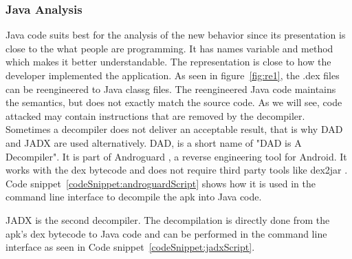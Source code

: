 \subsubsection{Java Analysis} \label{subsection:forensics-tools-java}
Java code suits best for the analysis of the new behavior since its presentation is close to the what people are programming.
It has names variable and method which makes it better understandable.
The representation is close to how the developer implemented the application.
\newline
As seen in figure~\ref{fig:re1}, the .dex files can be reengineered to Java \gls{classg} files.
The reengineered Java code maintains the semantics, but does not exactly match the source code.
As we will see, code attacked may contain instructions that are removed by the decompiler.
Sometimes a decompiler does not deliver an acceptable result, that is why DAD and JADX are used alternatively.
\newline
DAD, is a short name of "DAD is A Decompiler".
It is part of Androguard \cite{androguard}, a reverse engineering tool for Android.
It works with the dex bytecode and does not require third party tools like dex2jar \cite{dex2jar}.
Code snippet~\ref{codeSnippet:androguardScript} shows how it is used in the command line interface to decompile the \gls{apk} into Java code.
\newline

\newline
JADX \cite{jadx} is the second decompiler.
The decompilation is directly done from the \gls{apk}'s dex bytecode to Java code and can be performed in the command line interface as seen in Code snippet~\ref{codeSnippet:jadxScript}.
\newline

